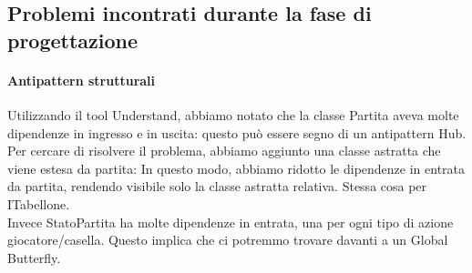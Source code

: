 \documentclass{article}
\begin{document}
\subsection{Problemi incontrati durante la fase di progettazione}
\paragraph{Antipattern strutturali}
Utilizzando il tool Understand, abbiamo notato che la classe Partita aveva molte dipendenze in ingresso e in uscita: questo può essere segno di un antipattern Hub. Per cercare di risolvere il problema, abbiamo aggiunto una classe astratta che viene estesa da partita: In questo modo, abbiamo ridotto le dipendenze in entrata da partita, rendendo visibile solo la classe astratta relativa. Stessa cosa per ITabellone.
\\Invece StatoPartita ha molte dipendenze in entrata, una per ogni tipo di azione 
giocatore/casella. Questo implica che ci potremmo trovare davanti a un Global Butterfly.

\paragraph{}
\end{document}
